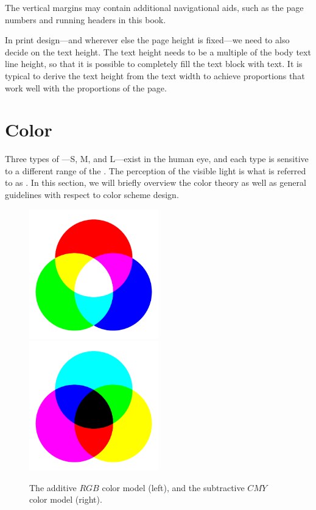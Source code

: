 The vertical margins may contain additional navigational aids, such as the page
numbers and running headers in this book.~\cite[sec.\,8.5.2]{bringhurst92}

In print design---and wherever else the page height is fixed---we need to also
decide on the text height. The text height needs to be a multiple of the body
text line height, so that it is possible to completely fill the text block with
text.  It is typical to derive the text height from the text width to achieve
proportions that work well with the proportions of the
page.~\cite[sec.\,8.4.2]{bringhurst92}

\section{Color}
Three types of ---S, M, and L---exist in the human eye, and
each type is sensitive to a different range of the .  The
perception of the visible light is what is referred to as . In this
section, we will briefly overview the color theory as well as general
guidelines with respect to color scheme design.

\begin{figure}
  \includegraphics[width=0.5\textwidth]{examples/03/rgb}%
  \includegraphics[width=0.5\textwidth]{examples/03/cmy}
  \caption{The additive $RGB$ color model (left), and the subtractive $CMY$
    color model (right).}
  \label{fig:color-models}
\end{figure}

